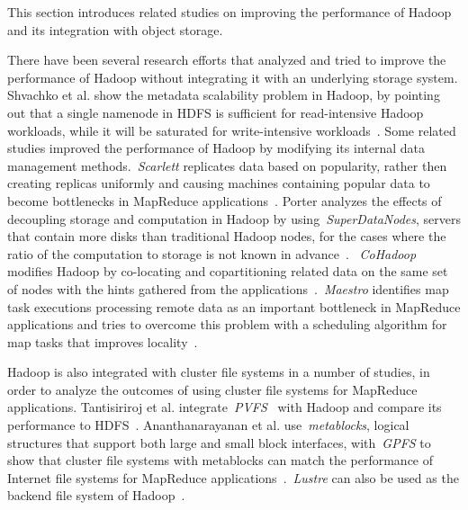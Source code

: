 \label{relatedwork}
This section introduces related studies on improving the performance of Hadoop and its integration with object
storage.

There have been several research efforts that analyzed and tried to improve the performance of Hadoop without
integrating it with an underlying storage system. Shvachko et al. show the metadata scalability problem in Hadoop,
by pointing out that a single namenode in HDFS 
is sufficient for read-intensive Hadoop workloads, while it will be saturated for write-intensive
workloads~\cite{shvachko2010hdfs}. Some related studies improved the performance of Hadoop by modifying
its internal data management methods.~\textit{Scarlett} replicates data based on popularity, rather then
creating replicas uniformly and causing machines containing popular data to become bottlenecks in MapReduce
applications~\cite{Ananthanarayanan:2011:SCS:1966445.1966472}. Porter analyzes the effects of decoupling storage and
computation in Hadoop by using~\textit{SuperDataNodes}, servers that contain more disks than traditional Hadoop nodes,
for the cases where the ratio of the computation to storage is not known in advance~\cite{Porter:2010:DSC:1773912.1773923}.
~\textit{CoHadoop} modifies Hadoop by co-locating and copartitioning related data on the same set of nodes with the hints
gathered from the applications~\cite{Eltabakh:2011:CFD:2002938.2002943}.~\textit{Maestro} identifies map task executions
processing remote data as an important bottleneck in MapReduce applications and tries to overcome this problem with
a scheduling algorithm for map tasks that improves locality~\cite{6217451}.


Hadoop is also integrated with cluster file systems in a number of studies, in order to analyze the outcomes of using
cluster file systems for MapReduce applications. Tantisiriroj et al. integrate~\textit{PVFS}~\cite{Carns:2000:PPF:1268379.1268407}
with Hadoop and compare its performance to
HDFS~\cite{Tantisiriroj:2011:DDF:2063384.2063474}. Ananthanarayanan et al. use~\textit{metablocks}, logical
structures that support both large and small block interfaces, with~\textit{GPFS} to show that cluster file systems with
metablocks can match the performance of Internet file systems for MapReduce
applications~\cite{Ananthanarayanan:2009:CAW:1855533.1855548}.~\textit{Lustre} can also be used as the
backend file system of Hadoop~\cite{lustre_with_hadoop}.

